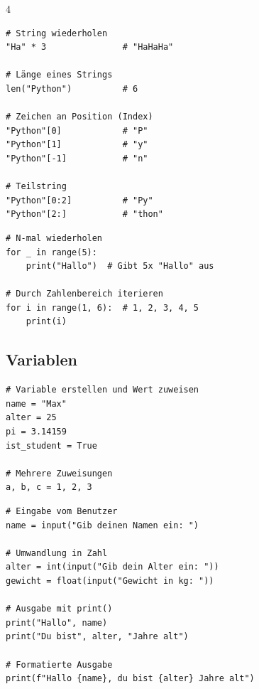 \begin{landscape}
\begin{multicols*}{4}
\begin{cheatSheetBox}[title=String-Operationen]
\begin{lstlisting}
# String wiederholen
"Ha" * 3               # "HaHaHa"

# Länge eines Strings
len("Python")          # 6

# Zeichen an Position (Index)
"Python"[0]            # "P"
"Python"[1]            # "y"
"Python"[-1]           # "n"

# Teilstring
"Python"[0:2]          # "Py"
"Python"[2:]           # "thon"
\end{lstlisting}
		\end{cheatSheetBox}

		\begin{cheatSheetBox}[title=Einfache Schleifen mit \lstinline|for|]
			\begin{lstlisting}
# N-mal wiederholen
for _ in range(5):
    print("Hallo")  # Gibt 5x "Hallo" aus

# Durch Zahlenbereich iterieren
for i in range(1, 6):  # 1, 2, 3, 4, 5
    print(i)
\end{lstlisting}
		\end{cheatSheetBox}

		\columnbreak\textcolor{\cheatSheetColor}{\subsection*{Variablen}}

		\begin{cheatSheetBox}[title=Variablen deklarieren]
			\begin{lstlisting}
# Variable erstellen und Wert zuweisen
name = "Max"
alter = 25
pi = 3.14159
ist_student = True

# Mehrere Zuweisungen
a, b, c = 1, 2, 3
\end{lstlisting}
		\end{cheatSheetBox}

		\begin{cheatSheetBox}[title=Eingabe und Ausgabe]
			\begin{lstlisting}
# Eingabe vom Benutzer
name = input("Gib deinen Namen ein: ")

# Umwandlung in Zahl
alter = int(input("Gib dein Alter ein: "))
gewicht = float(input("Gewicht in kg: "))

# Ausgabe mit print()
print("Hallo", name)
print("Du bist", alter, "Jahre alt")

# Formatierte Ausgabe
print(f"Hallo {name}, du bist {alter} Jahre alt")
\end{lstlisting}
		\end{cheatSheetBox}


\end{multicols*}
\end{landscape}
